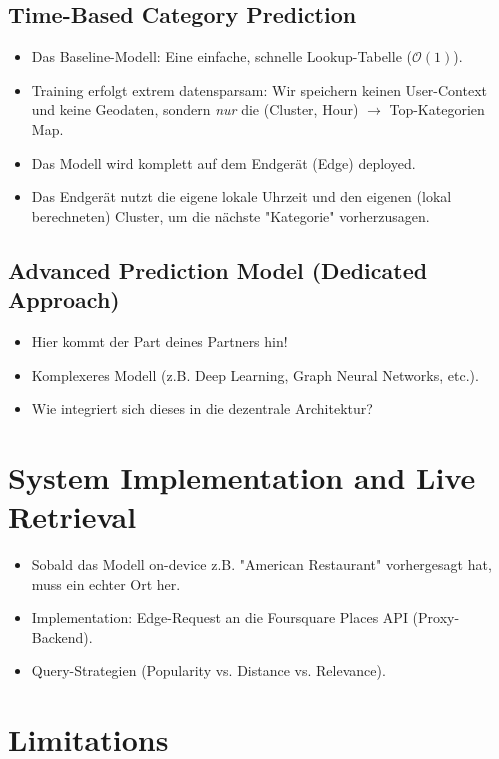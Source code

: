 \documentclass[11pt, a4paper]{article}
\begin{document}
\subsection{Time-Based Category Prediction}
\begin{itemize}
    \item Das Baseline-Modell: Eine einfache, schnelle Lookup-Tabelle ($\mathcal{O}(1)$).
    \item Training erfolgt extrem datensparsam: Wir speichern keinen User-Context und keine Geodaten, sondern \textit{nur} die (Cluster, Hour) $\rightarrow$ Top-Kategorien Map.
    \item Das Modell wird komplett auf dem Endgerät (Edge) deployed.
    \item Das Endgerät nutzt die eigene lokale Uhrzeit und den eigenen (lokal berechneten) Cluster, um die nächste "Kategorie" vorherzusagen.
\end{itemize}

\subsection{Advanced Prediction Model (Dedicated Approach)}
\begin{itemize}
    \item Hier kommt der Part deines Partners hin!
    \item Komplexeres Modell (z.B. Deep Learning, Graph Neural Networks, etc.).
    \item Wie integriert sich dieses in die dezentrale Architektur?
\end{itemize}

\section{System Implementation and Live Retrieval}
\begin{itemize}
    \item Sobald das Modell on-device z.B. "American Restaurant" vorhergesagt hat, muss ein echter Ort her.
    \item Implementation: Edge-Request an die Foursquare Places API (Proxy-Backend).
    \item Query-Strategien (Popularity vs. Distance vs. Relevance).
\end{itemize}

\section{Limitations}
\end{document}
